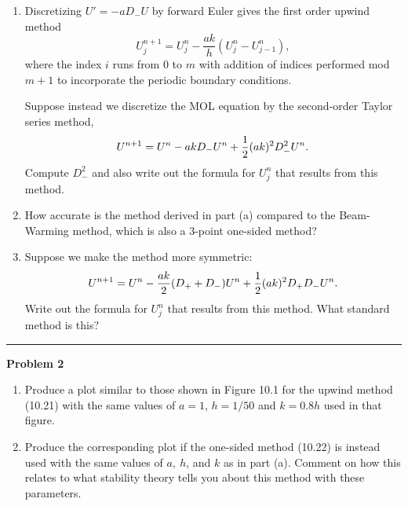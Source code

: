 \documentclass[10pt]{article}
\begin{document}
\begin{enumerate} 
\item Discretizing $U' = -aD_-U$ by forward Euler gives the first order
upwind method
\[
U_j^{n+1} = U_j^n - \frac{ak}{h} (U_j^n - U_{j-1}^n),
\]
where the index $i$ runs from 0 to $m$ with addition of indices performed
mod $m+1$ to incorporate the periodic boundary conditions.

Suppose instead we discretize the MOL equation by the second-order Taylor
series method, 
\[
U^{n+1} = U^n - akD_-U^n + \frac{1}{2} (ak)^2 D_-^2 U^n.
\]
Compute $D_-^2$ and also write out the formula for $U_j^n$ that results from
this method.  

\item How accurate is the method derived in part (a) compared to the
Beam-Warming method, which is also a 3-point one-sided method?

\item Suppose we make the method more symmetric:
\[
U^{n+1} = U^n - \frac{ak}{2} (D_+ +D_-)U^n + \frac{1}{2} (ak)^2 D_+D_- U^n.
\]
Write out the formula for $U_j^n$ that results from this method.  
What standard method is this?

\end{enumerate}





\vskip 1cm
\hrule
{\bf Problem 2}  


\begin{enumerate} 
\item
Produce a plot similar to those shown in Figure 10.1 for the upwind method
(10.21) with the same values of $a=1$, $h=1/50$ and $k=0.8h$
used in that figure.

\item Produce the corresponding plot if the one-sided method (10.22) is
instead used with the same values of $a,~h$, and $k$ as in part (a).
Comment on how this relates to what stability theory tells you about this
method with these parameters.
\end{enumerate}


\end{document}
